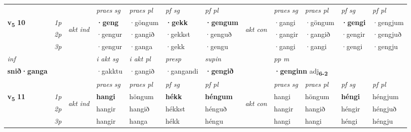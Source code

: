 \begin{longtable}[l]{X>{\footnotesize\itshape}llXXXXlXXXX}
\midrule

 & &   & \textit{praes sg}  & \textit{praes pl}    & \textit{ pf sg} & \textit{pf pl} & & \textit{praes sg}  & \textit{praes pl}    & \textit{pf sg} & \textit{pf pl }  \\ \cmidrule{4-7} \cmidrule{9-12}
 \multirow{2}{*}{{{\textbf{v{\textsubscript{5}}} \Large{\textbf{10}}}}}  & 1p & \multirow{3}{*}{\begin{turn}{90}\textit{akt ind}\end{turn}} & \textbf{·geng} & ·göngum & \textbf{·gekk} & \textbf{·gengum} & \multirow{3}{*}{\begin{turn}{90}\textit{akt con}\end{turn}} &·gangi & ·göngum & \textbf{·gengi} & ·gengjum\\*
 & 2p &  &  ·gengur  & ·gangið & ·gekkst & ·genguð & & ·gangir & ·gangið & ·gengir & ·gengjuð \\*
 & 3p &  & ·gengur & ·ganga & ·gekk & ·gengu & & ·gangi & ·gangi& ·gengi & ·gengju \\*
\cmidrule{4-7} \cmidrule{9-12}

   {\textit{inf}} & &  & \textit{i akt sg} & \textit{i akt pl}   & \textit{presp} & \textit{supin}  && \textit{pp m} \\*
  {\textbf{snið\allowbreak ·ganga}} & && ·gakktu  & ·gangið   & ·gangandi &  \textbf{·gengið}  && \multicolumn{2}{l}{\textbf{·genginn} adj\textbf{\textsubscript{6-2}}} \\*

\midrule

 & &   & \textit{praes sg}  & \textit{praes pl}    & \textit{ pf sg} & \textit{pf pl} & & \textit{praes sg}  & \textit{praes pl}    & \textit{pf sg} & \textit{pf pl }  \\ \cmidrule{4-7} \cmidrule{9-12}
 \multirow{2}{*}{{{\textbf{v{\textsubscript{5}}} \Large{\textbf{11}}}}}  & 1p & \multirow{3}{*}{\begin{turn}{90}\textit{akt ind}\end{turn}} & \textbf{hangi} & höngum & \textbf{hékk} & \textbf{héngum} & \multirow{3}{*}{\begin{turn}{90}\textit{akt con}\end{turn}} &hangi & höngum & \textbf{héngi} & héngjum\\*
 & 2p &  &  hangir  & hangið & hékkst & hénguð & & hangir & hangið & héngir & héngjuð \\*
 & 3p &  & hangir & hanga & hékk & héngu & & hangi & hangi& héngi & héngju \\*
\cmidrule{4-7} \cmidrule{9-12}


\end{longtable}
